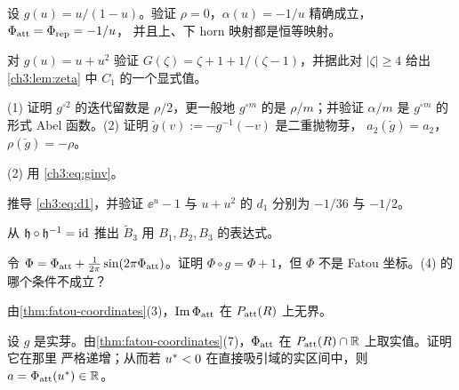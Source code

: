 \exercises

\begin{exercise}\label{ch3:exe:mobius}
设 $g(u)=u/(1-u)$。验证 $\rho=0$，$\alpha(u)=-1/u$ 精确成立，$\Phi_{\mathrm{att}}=\Phi_{\mathrm{rep}}=-1/u$，
并且上、下 horn 映射都是恒等映射。
\end{exercise}

\begin{exercise}\label{ch3:exe:quadG}
对 $g(u)=u+u^2$ 验证 $G(\zeta)=\zeta+1+1/(\zeta-1)$，并据此对 $|\zeta|\ge4$ 给出\cref{ch3:lem:zeta}
中 $C_1$ 的一个显式值。
\end{exercise}

\begin{exercise}\label{ch3:exe:rho-iterate}
(1) 证明 $g^{\circ2}$ 的迭代留数是 $\rho/2$，更一般地 $g^{\circ m}$ 的是 $\rho/m$；并验证 $\alpha/m$
是 $g^{\circ m}$ 的形式 Abel 函数。(2) 证明 $\breve g(v):=-g^{-1}(-v)$ 是二重抛物芽，
$a_2(\breve g)=a_2$，$\rho(\breve g)=-\rho$。
\end{exercise}
\begin{hint}
(2) 用 \eqref{ch3:eq:ginv}。
\end{hint}

\begin{exercise}\label{ch3:exe:d1}
推导 \eqref{ch3:eq:d1}，并验证 $\ee^u-1$ 与 $u+u^2$ 的 $d_1$ 分别为 $-1/36$ 与 $-1/2$。
\end{exercise}

\begin{exercise}\label{ch3:exe:Btilde}
从 $\mathfrak h\circ\mathfrak h^{-1}=\mathrm{id}$ 推出 $\tilde B_3$ 用 $B_1,B_2,B_3$ 的表达式。
\end{exercise}

\begin{exercise}\label{ch3:exe:nonunique}
令 $\Phi=\Phi_{\mathrm{att}}+\frac{1}{2\pi}\sin(2\pi\Phi_{\mathrm{att}})$。证明 $\Phi\circ g=\Phi+1$，但 $\Phi$ 不是 Fatou
坐标。(4) 的哪个条件不成立？
\end{exercise}
\begin{hint}
由\cref{thm:fatou-coordinates}(3)，$\operatorname{Im}\Phi_{\mathrm{att}}$ 在 $P_{\mathrm{att}}(R)$ 上无界。
\end{hint}

\begin{exercise}\label{ch3:exe:real}
设 $g$ 是实芽。由\cref{thm:fatou-coordinates}(7)，$\Phi_{\mathrm{att}}$ 在 $P_{\mathrm{att}}(R)\cap\mathbb{R}$ 上取实值。证明它在那里
严格递增；从而若 $u^{*}<0$ 在直接吸引域的实区间中，则 $a=\Phi_{\mathrm{att}}(u^{*})\in\mathbb{R}$。
\end{exercise}

